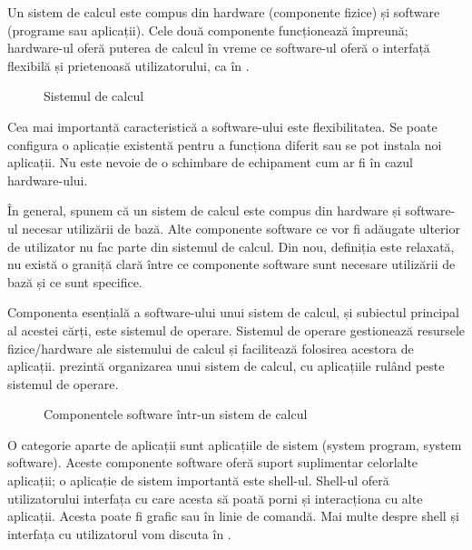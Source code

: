 Un sistem de calcul este compus din hardware (componente fizice) și software (programe sau aplicații). Cele două componente funcționează împreună; hardware-ul oferă puterea de calcul în vreme ce software-ul oferă o interfață flexibilă și prietenoasă utilizatorului, ca în .

\begin{figure}[htbp]
  \centering
  \def\svgwidth{\columnwidth}
  
  \caption{Sistemul de calcul}
  \label{fig:intro:computing-system}
\end{figure}

Cea mai importantă caracteristică a software-ului este flexibilitatea. Se poate configura o aplicație existentă pentru a funcționa diferit sau se pot instala noi aplicații. Nu este nevoie de o schimbare de echipament cum ar fi în cazul hardware-ului.

În general, spunem că un sistem de calcul este compus din hardware și software-ul necesar utilizării de bază. Alte componente software ce vor fi adăugate ulterior de utilizator nu fac parte din sistemul de calcul. Din nou, definiția este relaxată, nu există o graniță clară între ce componente software sunt necesare utilizării de bază și ce sunt specifice.

Componenta esențială a software-ului unui sistem de calcul, și subiectul principal al acestei cărți, este sistemul de operare. Sistemul de operare gestionează resursele fizice/hardware ale sistemului de calcul și facilitează folosirea acestora de aplicații.  prezintă organizarea unui sistem de calcul, cu aplicațiile rulând peste sistemul de operare.

\begin{figure}[htbp]
  \centering
  \def\svgwidth{\columnwidth}
  
  \caption{Componentele software într-un sistem de calcul}
  \label{fig:intro:computing-software}
\end{figure}

O categorie aparte de aplicații sunt aplicațiile de sistem (system program, system software). Aceste componente software oferă suport suplimentar celorlalte aplicații; o aplicație de sistem importantă este shell-ul. Shell-ul oferă utilizatorului interfața cu care acesta să poată porni și interacționa cu alte aplicații. Acesta poate fi grafic sau în linie de comandă. Mai multe despre shell și interfața cu utilizatorul vom discuta în .

